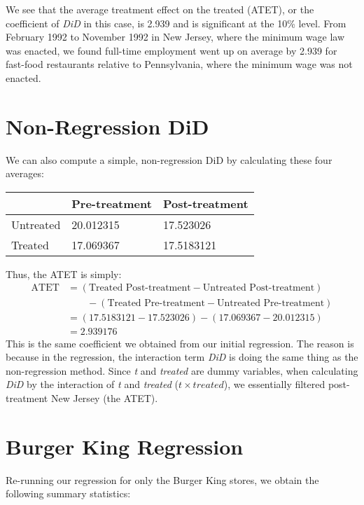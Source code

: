 \documentclass[a4paper]{article}
\begin{document}
	We see that the average treatment effect on the treated (ATET), or the coefficient of \textit{DiD} in this case, is 2.939 and is significant at the 10\% level. From February 1992 to November 1992 in New Jersey, where the minimum wage law was enacted, we found full-time employment went up on average by 2.939 for fast-food restaurants relative to Pennsylvania, where the minimum wage was not enacted. \\
	
	\section{Non-Regression DiD}
	We can also compute a simple, non-regression DiD by calculating these four averages:
	\begin{table}[ht] \centering
		\begin{tabular}{|l|l|l|}
			\hline
			& Pre-treatment & Post-treatment \\ \hline
			Untreated & 20.012315    & 17.523026     \\ \hline
			Treated   & 17.069367    & 17.5183121    \\ \hline
		\end{tabular}
	\end{table}

	Thus, the ATET is simply:
	\begin{equation*}
		\begin{aligned}
			\textrm{ATET} &= (\textrm{Treated Post-treatment}-\textrm{Untreated Post-treatment})\\&\qquad -(\textrm{Treated Pre-treatment}-\textrm{Untreated Pre-treatment})\\
			&=(17.5183121-17.523026 )-(17.069367-20.012315)\\
			&=2.939176
		\end{aligned}
	\end{equation*}
	This is the same coefficient we obtained from our initial regression. The reason is because in the regression, the interaction term \textit{DiD} is doing the same thing as the non-regression method. Since \textit{t} and \textit{treated} are dummy variables, when calculating \textit{DiD} by the interaction of \textit{t} and \textit{treated} ($ t\times treated $), we essentially filtered post-treatment New Jersey (the ATET). \\
	\pagebreak
	
	\section{Burger King Regression}
	Re-running our regression for only the Burger King stores, we obtain the following summary statistics:
	
\end{document}
